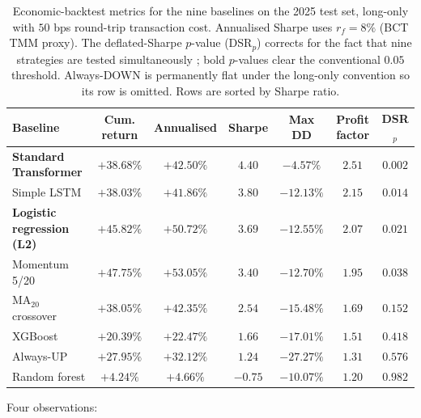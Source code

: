 \documentclass[conference]{IEEEtran}
\begin{document}
\begin{table}[htbp]
\centering
\caption{Economic-backtest metrics for the nine baselines on the 2025 test set, long-only with $50$ bps round-trip transaction cost. Annualised Sharpe uses $r_f = 8\%$ (BCT TMM proxy). The deflated-Sharpe $p$-value (DSR$_p$) corrects for the fact that nine strategies are tested simultaneously \cite{ref:deflated_sharpe}; bold $p$-values clear the conventional $0.05$ threshold. Always-DOWN is permanently flat under the long-only convention so its row is omitted. Rows are sorted by Sharpe ratio.}
\label{tab:economic_metrics}
\small
\begin{tabular}{lcccccc}
\toprule
\textbf{Baseline} & \textbf{Cum. return} & \textbf{Annualised} & \textbf{Sharpe} & \textbf{Max DD} & \textbf{Profit factor} & \textbf{DSR$_p$} \\
\midrule
\textbf{Standard Transformer}            & $+38.68\%$ & $+42.50\%$ & $\mathbf{4.40}$ & $\mathbf{-4.57\%}$ & $\mathbf{2.51}$ & $\mathbf{0.002}$ \\
Simple LSTM                              & $+38.03\%$ & $+41.86\%$ & $3.80$ & $-12.13\%$ & $2.15$ & $\mathbf{0.014}$ \\
\textbf{Logistic regression (L2)}        & $\mathbf{+45.82\%}$ & $\mathbf{+50.72\%}$ & $3.69$ & $-12.55\%$ & $2.07$ & $\mathbf{0.021}$ \\
Momentum 5/20                            & $+47.75\%$ & $+53.05\%$ & $3.40$ & $-12.70\%$ & $1.95$ & $\mathbf{0.038}$ \\
MA$_{20}$ crossover                      & $+38.05\%$ & $+42.35\%$ & $2.54$ & $-15.48\%$ & $1.69$ & $0.152$ \\
XGBoost                                  & $+20.39\%$ & $+22.47\%$ & $1.66$ & $-17.01\%$ & $1.51$ & $0.418$ \\
Always-UP                                & $+27.95\%$ & $+32.12\%$ & $1.24$ & $-27.27\%$ & $1.31$ & $0.576$ \\
Random forest                            & $+4.24\%$  & $+4.66\%$  & $-0.75$ & $-10.07\%$ & $1.20$ & $0.982$ \\
\bottomrule
\end{tabular}
\normalsize
\end{table}

Four observations:
\end{document}
